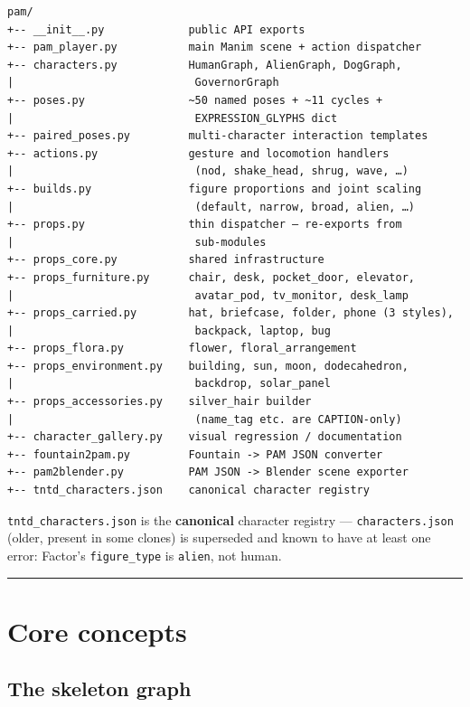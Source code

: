 \documentclass[
  12pt,
  letterpaper,
]{book}
\begin{document}
\begin{verbatim}
pam/
+-- __init__.py             public API exports
+-- pam_player.py           main Manim scene + action dispatcher
+-- characters.py           HumanGraph, AlienGraph, DogGraph,
|                            GovernorGraph
+-- poses.py                ~50 named poses + ~11 cycles +
|                            EXPRESSION_GLYPHS dict
+-- paired_poses.py         multi-character interaction templates
+-- actions.py              gesture and locomotion handlers
|                            (nod, shake_head, shrug, wave, …)
+-- builds.py               figure proportions and joint scaling
|                            (default, narrow, broad, alien, …)
+-- props.py                thin dispatcher — re-exports from
|                            sub-modules
+-- props_core.py           shared infrastructure
+-- props_furniture.py      chair, desk, pocket_door, elevator,
|                            avatar_pod, tv_monitor, desk_lamp
+-- props_carried.py        hat, briefcase, folder, phone (3 styles),
|                            backpack, laptop, bug
+-- props_flora.py          flower, floral_arrangement
+-- props_environment.py    building, sun, moon, dodecahedron,
|                            backdrop, solar_panel
+-- props_accessories.py    silver_hair builder
|                            (name_tag etc. are CAPTION-only)
+-- character_gallery.py    visual regression / documentation
+-- fountain2pam.py         Fountain -> PAM JSON converter
+-- pam2blender.py          PAM JSON -> Blender scene exporter
+-- tntd_characters.json    canonical character registry
\end{verbatim}

\texttt{tntd\_characters.json} is the \textbf{canonical} character
registry --- \texttt{characters.json} (older, present in some clones) is
superseded and known to have at least one error: Factor's
\texttt{figure\_type} is \texttt{alien}, not human.

\begin{center}\rule{0.5\linewidth}{0.5pt}\end{center}

\section{Core concepts}\label{core-concepts}

\subsection{The skeleton graph}\label{the-skeleton-graph}
\end{document}
